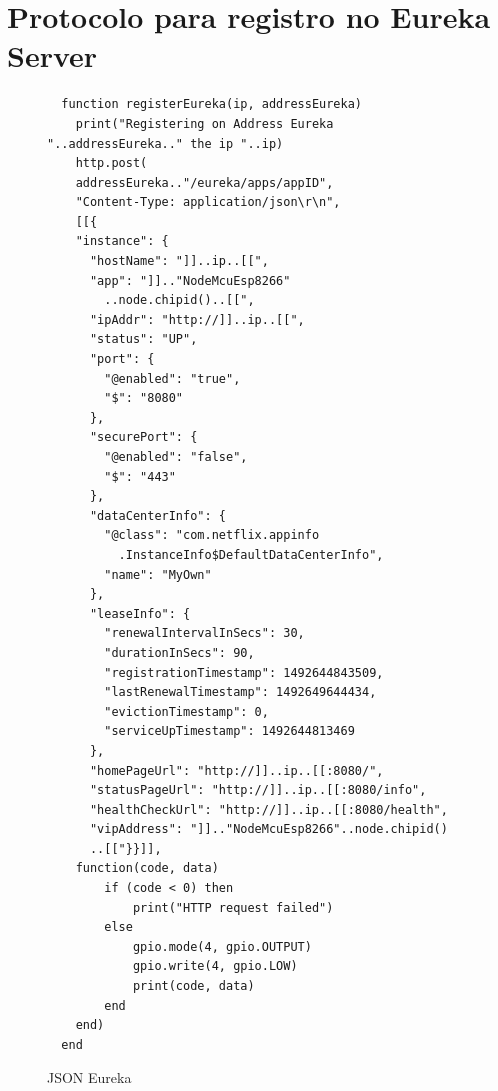 \documentclass[journal]{IEEEtran}
\begin{document}
\section{Protocolo para registro no Eureka Server}
\begin{figure}[H]
\centering

\begin{lstlisting}
  function registerEureka(ip, addressEureka)
    print("Registering on Address Eureka "..addressEureka.." the ip "..ip)
    http.post(
    addressEureka.."/eureka/apps/appID",
    "Content-Type: application/json\r\n",
    [[{
    "instance": {
      "hostName": "]]..ip..[[",
      "app": "]].."NodeMcuEsp8266"
        ..node.chipid()..[[",
      "ipAddr": "http://]]..ip..[[",
      "status": "UP",
      "port": {
        "@enabled": "true",
        "$": "8080"
      },
      "securePort": {
        "@enabled": "false",
        "$": "443"
      },
      "dataCenterInfo": {
        "@class": "com.netflix.appinfo
          .InstanceInfo$DefaultDataCenterInfo",
        "name": "MyOwn"
      },
      "leaseInfo": {
        "renewalIntervalInSecs": 30,
        "durationInSecs": 90,
        "registrationTimestamp": 1492644843509,
        "lastRenewalTimestamp": 1492649644434,
        "evictionTimestamp": 0,
        "serviceUpTimestamp": 1492644813469
      },
      "homePageUrl": "http://]]..ip..[[:8080/",
      "statusPageUrl": "http://]]..ip..[[:8080/info",
      "healthCheckUrl": "http://]]..ip..[[:8080/health",
      "vipAddress": "]].."NodeMcuEsp8266"..node.chipid()
      ..[["}}]],
    function(code, data)
        if (code < 0) then
            print("HTTP request failed")
        else
            gpio.mode(4, gpio.OUTPUT)
            gpio.write(4, gpio.LOW)
            print(code, data)
        end
    end)
  end

\end{lstlisting}
\caption{JSON Eureka}
\label{protocolojsoneureka}
\end{figure}

\clearpage
\end{document}
